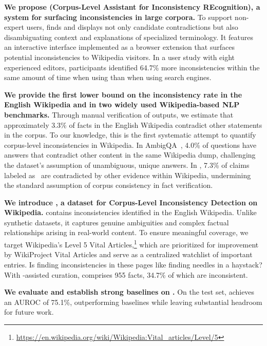 \textbf{We propose \system (Corpus-Level Assistant for Inconsistency REcognition), a system for surfacing inconsistencies in large corpora.} To support non-expert users, \system finds and displays not only candidate contradictions but also disambiguating context and explanations of specialized terminology. It features an interactive interface implemented as a browser extension that surfaces potential inconsistencies to Wikipedia visitors. In a user study with eight experienced editors, participants identified 64.7\% more inconsistencies within the same amount of time when using \system than when using search engines.

\textbf{We provide the first lower bound on the inconsistency rate in the English Wikipedia and in two widely used Wikipedia-based NLP benchmarks.} Through manual verification of \system outputs, we estimate that approximately 3.3\% of facts in the English Wikipedia contradict other statements in the corpus. To our knowledge, this is the first systematic attempt to quantify corpus-level inconsistencies in Wikipedia. In AmbigQA~\cite{min-etal-2020-ambigqa}, 4.0\% of questions have answers that contradict other content in the same Wikipedia dump, challenging the dataset's assumption of unambiguous, unique answers. In \feverous, 7.3\% of claims labeled as \supports~are contradicted by other evidence within Wikipedia, undermining the standard assumption of corpus consistency in fact verification.

\textbf{We introduce \dataset, a dataset for Corpus-Level Inconsistency Detection on Wikipedia.} \dataset contains inconsistencies identified in the English Wikipedia. Unlike synthetic datasets, it captures genuine ambiguities and complex factual relationships arising in real-world content. To ensure meaningful coverage, we target Wikipedia's Level 5 Vital Articles,\footnote{\url{https://en.wikipedia.org/wiki/Wikipedia:Vital_articles/Level/5}} which are prioritized for improvement by WikiProject Vital Articles and serve as a centralized watchlist of important entries. Is finding inconsistencies in these pages like finding needles in a haystack? With \system-assisted curation, \dataset comprises 955 facts, 34.7\% of which are inconsistent.

\textbf{We evaluate \system and establish strong baselines on \dataset.} On the \dataset test set, \system achieves an AUROC of 75.1\%, outperforming baselines while leaving substantial headroom for future work.
